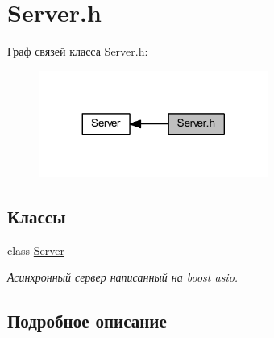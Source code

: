 \hypertarget{group__serverh}{}\section{Server.\+h}
\label{group__serverh}
Граф связей класса Server.\+h\+:\nopagebreak
\begin{figure}[H]
\begin{center}
\leavevmode
\includegraphics[width=212pt]{group__serverh}
\end{center}
\end{figure}
\subsection*{Классы}
\begin{DoxyCompactItemize}
\item 
class \mbox{\hyperlink{class_server}{Server}}
\begin{DoxyCompactList}\small\item\em Асинхронный сервер написанный на boost asio. \end{DoxyCompactList}\end{DoxyCompactItemize}


\subsection{Подробное описание}
